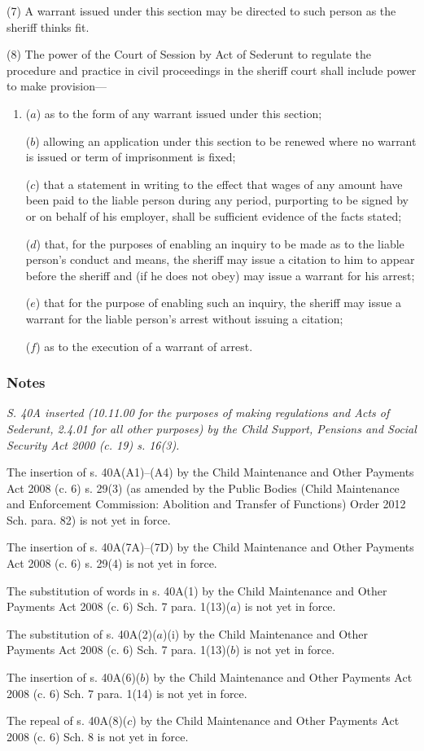 \documentclass[a4paper]{article}
\newcommand\amendment[1]{\subsubsection*{Notes}{\itshape\frenchspacing\footnotesize #1 \par}}
\begin{document}
(7) A warrant issued under this section may be directed to such person as the sheriff
thinks fit.

(8) The power of the Court of Session by Act of Sederunt to regulate the procedure
and practice in civil proceedings in the sheriff court shall include power to make
provision---
\begin{enumerate}\item[]
($a$) as to the form of any warrant issued under this section;

($b$) allowing an application under this section to be renewed where no warrant is
issued or term of imprisonment is fixed;

($c$) that a statement in writing to the effect that wages of any amount have been
paid to the liable person during any period, purporting to be signed by or on
behalf of his employer, shall be sufficient evidence of the facts stated;

($d$) that, for the purposes of enabling an inquiry to be made as to the liable
person’s conduct and means, the sheriff may issue a citation to him to appear
before the sheriff and (if he does not obey) may issue a warrant for his arrest;

($e$) that for the purpose of enabling such an inquiry, the sheriff may issue a
warrant for the liable person’s arrest without issuing a citation;

($f$) as to the execution of a warrant of arrest.
\end{enumerate}

\amendment{
S. 40A inserted (10.11.00 for the purposes of making regulations and Acts of Sederunt, 2.4.01 for all other purposes) by the Child Support, Pensions and Social Security Act 2000 (c. 19) s. 16(3).


The insertion of s. 40A(A1)--(A4) by the Child Maintenance and Other Payments Act 2008 (c. 6) s. 29(3) (as amended by the Public Bodies (Child Maintenance and Enforcement Commission: Abolition and Transfer of Functions) Order 2012 Sch. para. 82) is not yet in force.

The insertion of s. 40A(7A)--(7D) by the Child Maintenance and Other Payments Act 2008 (c. 6) s. 29(4) is not yet in force.

The substitution of words in s. 40A(1) by the Child Maintenance and Other Payments Act 2008 (c. 6) Sch. 7 para. 1(13)($a$) is not yet in force.

The substitution of s. 40A(2)($a$)(i) by the Child Maintenance and Other Payments Act 2008 (c. 6) Sch. 7 para. 1(13)($b$) is not yet in force.

The insertion of s. 40A(6)($b$) by the Child Maintenance and Other Payments Act 2008 (c. 6) Sch. 7 para. 1(14) is not yet in force.

The repeal of s. 40A(8)($c$) by the Child Maintenance and Other Payments Act 2008 (c. 6) Sch. 8 is not yet in force.

}
\end{document}
